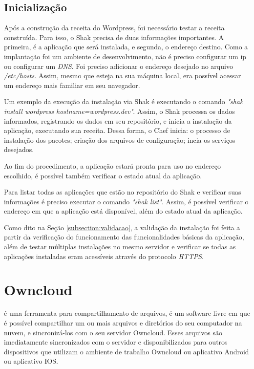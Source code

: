 \subsection{Inicialização}

Após a construção da receita do Wordpress, foi necessário testar a receita construída. 
Para isso, o Shak precisa de duas informações importantes. A primeira, é a aplicação
que será instalada, e segunda, o endereço destino. Como a implantação foi um ambiente de desenvolvimento,
não é preciso configurar um ip ou configurar um \textit{DNS}. Foi preciso adicionar o
endereço desejado no arquivo \textit{/etc/hosts}. Assim, mesmo que esteja na sua máquina local, 
era possível acessar um endereço mais familiar em seu navegador. 

Um exemplo da execução da instalação via Shak é executando o comando
\textit{"shak install wordpress hostname=wordpress.dev"}. Assim, o 
Shak processa os dados informados, registrando os dados em seu repositório, e
inicia a instalação da aplicação, executando sua receita. Dessa forma, o 
Chef inicia: o processo de instalação dos pacotes; criação dos arquivos
de configuração; incia os serviços desejados.

Ao fim do procedimento, a aplicação estará pronta para uso no endereço escolhido,
é possível também verificar o estado atual da aplicação.

Para listar todas as aplicações que estão no repositório do Shak e verificar 
suas informações é preciso executar o comando \textit{"shak list"}. Assim, é 
possível verificar o endereço em que a aplicação está disponível, além do estado atual da aplicação.

Como dito na Seção \ref{subsection:validacao}, a validação da instalação foi feita
a partir da verificação do funcionamento das funcionalidades básicas da aplicação,
além de testar múltiplas instalações no mesmo servidor e verificar se todas as
aplicações instaladas eram acessíveis através do protocolo \textit{HTTPS}.

\section{Owncloud}
\label{sub:owncloud}

 é uma ferramenta para compartilhamento de arquivos, é um software 
livre em que é possível compartilhar
um ou mais arquivos e diretórios do seu computador na nuvem, e sincronizá-los com o seu
servidor Owncloud. Esses arquivos são imediatamente sincronizados com o servidor
e disponibilizados para outros dispositivos que utilizam o ambiente de trabalho
Owncloud ou aplicativo Android ou aplicativo IOS.

